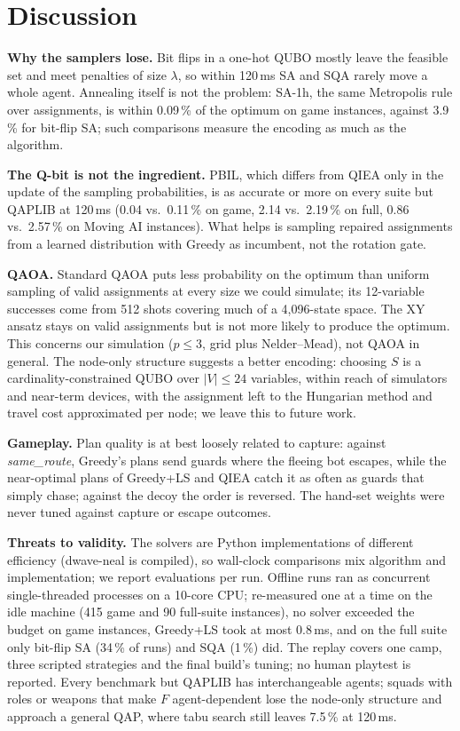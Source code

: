 \documentclass[sigconf]{acmart}
\begin{document}
\section{Discussion}\label{sec:disc}

\textbf{Why the samplers lose.} Bit flips in a one-hot QUBO mostly leave the feasible set and meet
penalties of size $\lambda$, so within 120\,ms SA and SQA rarely move a whole agent. Annealing itself
is not the problem: SA-1h, the same Metropolis rule over assignments, is within 0.09\,\% of the
optimum on game instances, against 3.9\,\% for bit-flip SA; such comparisons measure the encoding
as much as the algorithm.

\textbf{The Q-bit is not the ingredient.} PBIL, which differs from QIEA only in the update of the
sampling probabilities, is as accurate or more on every suite but QAPLIB at 120\,ms (0.04 vs.\ 0.11\,\% on
game, 2.14 vs.\ 2.19\,\% on full, 0.86 vs.\ 2.57\,\% on Moving AI instances). What helps is sampling repaired
assignments from a learned distribution with Greedy as incumbent, not the rotation gate.

\textbf{QAOA.} Standard QAOA puts less probability on the optimum than uniform sampling of valid
assignments at every size we could simulate; its 12-variable successes come from 512 shots covering
much of a 4{,}096-state space. The XY ansatz stays on valid assignments but is not more likely to
produce the optimum. This concerns our simulation ($p\le3$, grid plus Nelder--Mead), not QAOA in
general. The node-only structure suggests a better encoding: choosing $S$ is a
cardinality-constrained QUBO over $|V|\le24$ variables, within reach of simulators and near-term
devices, with the assignment left to the Hungarian method and travel cost approximated per node;
we leave this to future work.

\textbf{Gameplay.} Plan quality is at best loosely related to capture: against \emph{same\_route},
Greedy's plans send guards where the fleeing bot escapes, while the near-optimal plans of Greedy+LS
and QIEA catch it as often as guards that simply chase; against the decoy the order is reversed.
The hand-set weights were never tuned against capture or escape outcomes.

\textbf{Threats to validity.} The solvers are Python implementations of different efficiency
(dwave-neal is compiled), so wall-clock comparisons mix algorithm and implementation; we report
evaluations per run. Offline runs ran as concurrent single-threaded processes on a 10-core CPU;
re-measured one at a time on the idle machine (415 game and 90 full-suite instances), no solver
exceeded the budget on game instances, Greedy+LS took at most 0.8\,ms, and on the full suite only
bit-flip SA (34\,\% of runs) and SQA (1\,\%) did. The replay covers one camp, three scripted
strategies and the final build's tuning; no human playtest is reported. Every benchmark but QAPLIB
has interchangeable agents; squads with roles or weapons that make $F$ agent-dependent lose the
node-only structure and approach a general QAP, where tabu search still leaves 7.5\,\% at 120\,ms.
\end{document}
